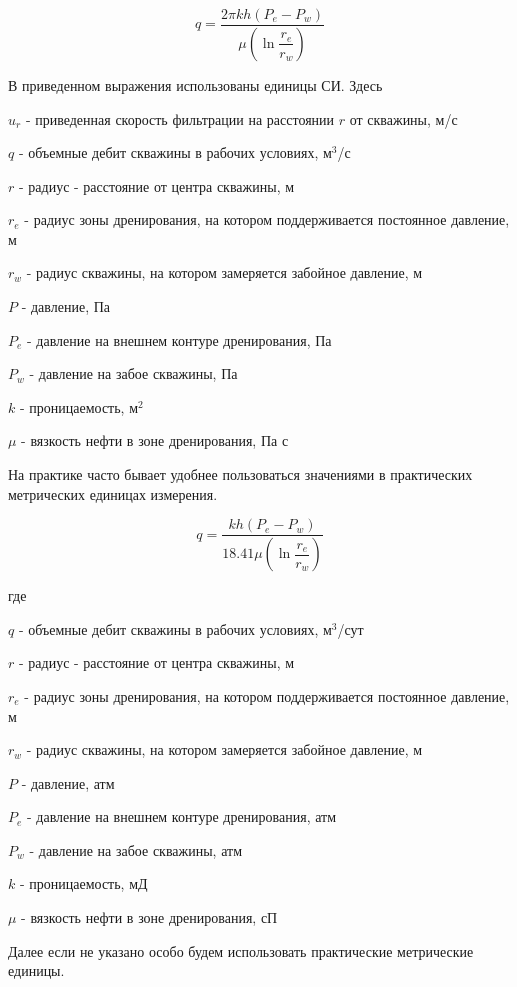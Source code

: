 \begin{equation} \label{eq:dupui_1}
q=\frac{2\pi kh\left(P_e-P_w\right)}{\mu\left(\ln{\dfrac{r_e}{r_w}}\right)}
\end{equation}


В приведенном выражения использованы единицы СИ. Здесь 

$u_r$ - приведенная скорость фильтрации на расстоянии $r$ от скважины, м/с 

$q$ - объемные дебит скважины в рабочих условиях, м$^3$/с

$r$ -  радиус - расстояние от центра скважины, м

$r_e$ -  радиус зоны дренирования, на котором поддерживается постоянное давление, м

$r_w$ - радиус скважины, на котором замеряется забойное давление, м

$P$ - давление, Па

$P_e$ - давление на внешнем контуре дренирования, Па

$P_w$ - давление на забое скважины, Па

$k$ - проницаемость, м$^2$

$\mu$ - вязкость нефти в зоне дренирования, Па с

На практике часто бывает удобнее пользоваться значениями в практических метрических единицах измерения. 

\begin{equation} \label{eq:dupui_2}
q=\frac{kh\left(P_e-P_w\right)}{ 18.41 \mu\left(\ln{\dfrac{r_e}{r_w}}\right)}
\end{equation}

где 

$q$ - объемные дебит скважины в рабочих условиях, м$^3$/сут

$r$ -  радиус - расстояние от центра скважины, м

$r_e$ -  радиус зоны дренирования, на котором поддерживается постоянное давление, м

$r_w$ - радиус скважины, на котором замеряется забойное давление, м

$P$ - давление, атм

$P_e$ - давление на внешнем контуре дренирования, атм

$P_w$ - давление на забое скважины, атм

$k$ - проницаемость, мД

$\mu$ - вязкость нефти в зоне дренирования, сП

Далее если не указано особо будем использовать практические метрические единицы.

